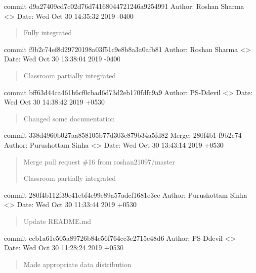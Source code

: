 \documentclass[letterpaper,10pt,english]{sphinxmanual}
\begin{document}
commit d9a27409cd7c02d76d74168044721246a9254991
Author: Roshan Sharma \textless{}\textgreater{}
Date:   Wed Oct 30 14:35:32 2019 -0400
\begin{quote}

Fully  integrated
\end{quote}

commit f9b2c74ef8d29720198a03f51c9e8b8a3a0afb81
Author: Roshan Sharma \textless{}\textgreater{}
Date:   Wed Oct 30 13:38:04 2019 -0400
\begin{quote}

Classroom partially integrated
\end{quote}

commit bff63d44ca461b6cf0cbad6d73d2eb170fdfc9a9
Author: PS-Ddevil \textless{}\textgreater{}
Date:   Wed Oct 30 14:38:42 2019 +0530
\begin{quote}

Changed some documentation
\end{quote}

commit 338d4960b027aa858105b77d303e879b34a5fd82
Merge: 280f4b1 f9b2c74
Author: Purushottam Sinha \textless{}\textgreater{}
Date:   Wed Oct 30 13:43:14 2019 +0530
\begin{quote}

Merge pull request \#16 from roshan21097/master

Classroom partially integrated
\end{quote}

commit 280f4b112f39e41ebf4e99e89a57adcf1681e3ec
Author: Purushottam Sinha \textless{}\textgreater{}
Date:   Wed Oct 30 11:33:44 2019 +0530
\begin{quote}

Update README.md
\end{quote}

commit ecb1a61e505a89726b84e56f764cc3e2715e48d6
Author: PS-Ddevil \textless{}\textgreater{}
Date:   Wed Oct 30 11:28:24 2019 +0530
\begin{quote}

Made appropriate data distribution
\end{quote}
\end{document}
